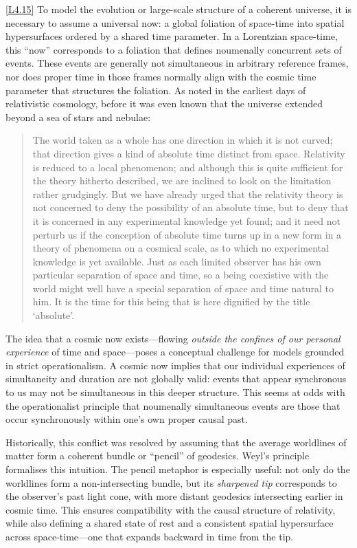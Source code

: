 \documentclass[12pt]{book}
\newcounter{logicanchor}
\newenvironment{logicanchorenv}[1]{\refstepcounter{logicanchor}\label{#1}}{}
\newcommand{\logiclink}[2]{\begin{logicanchorenv}{logic:#1}\end{logicanchorenv}\hyperref[appendix:#1]{[#1]}\xspace}
\begin{document}
\logiclink{L4.15}{} To model the evolution or large-scale structure of a coherent universe, it is necessary to assume a universal now: a global foliation of space-time into spatial hypersurfaces ordered by a shared time parameter. In a Lorentzian space-time, this ``now'' corresponds to a foliation that defines noumenally concurrent sets of events. These events are generally not simultaneous in arbitrary reference frames, nor does proper time in those frames normally align with the cosmic time parameter that structures the foliation. As \citet{Eddington1920} noted in the earliest days of relativistic cosmology, before it was even known that the universe extended beyond a sea of stars and nebulae:
\begin{quote}
The world taken as a whole has one direction in which it is not curved; that direction gives a kind of absolute time distinct from space. Relativity is reduced to a local phenomenon; and although this is quite sufficient for the theory hitherto described, we are inclined to look on the limitation rather grudgingly. But we have already urged that the relativity theory is not concerned to deny the possibility of an absolute time, but to deny that it is concerned in any experimental knowledge yet found; and it need not perturb us if the conception of absolute time turns up in a new form in a theory of phenomena on a cosmical scale, as to which no experimental knowledge is yet available. Just as each limited observer has his own particular separation of space and time, so a being coexistive with the world might well have a special separation of space and time natural to him. It is the time for this being that is here dignified by the title `absolute'.
\end{quote}

The idea that a cosmic now exists---flowing \textit{outside the confines of our personal experience} of time and space---poses a conceptual challenge for models grounded in strict operationalism. A cosmic now implies that our individual experiences of simultaneity and duration are not globally valid: events that appear synchronous to us may not be simultaneous in this deeper structure. This seems at odds with the operationalist principle that noumenally simultaneous events are those that occur synchronously within one's own proper causal past.

Historically, this conflict was resolved by assuming that the average worldlines of matter form a coherent bundle or ``pencil'' of geodesics. Weyl's principle formalises this intuition. The pencil metaphor is especially useful: not only do the worldlines form a non-intersecting bundle, but its \textit{sharpened tip} corresponds to the observer's past light cone, with more distant geodesics intersecting earlier in cosmic time. This ensures compatibility with the causal structure of relativity, while also defining a shared state of rest and a consistent spatial hypersurface across space-time---one that expands backward in time from the tip.
\end{document}

